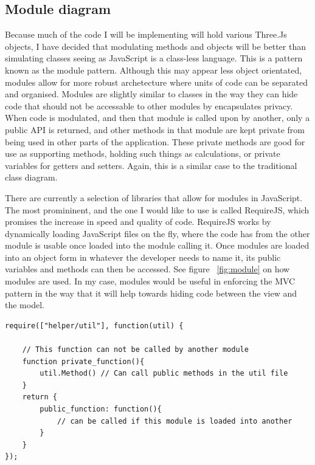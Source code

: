 \subsection{Module diagram}
\label{sec:module}
Because much of the code I will be implementing will hold various Three.Js objects, I have decided that modulating methods and objects will be better than simulating classes seeing as JavaScript is a class-less language. This is a pattern known as the module pattern. Although this may appear less object orientated, modules allow for more robust archetecture where units of code can be separated and organised. Modules are slightly similar to classes in the way they can hide code that should not be accessable to other modules by encapsulates privacy. When code is modulated, and then that module is called upon by another, only a public API is returned, and other methods in that module are kept private from being used in other parts of the application. These private methods are good for use as supporting methods, holding such things as calculations, or private variables for getters and setters. Again, this is a similar case to the traditional class diagram.

There are currently a selection of libraries that allow for modules in JavaScript. The most promininent, and the one I would like to use is called RequireJS, which promises the increase in speed and quality of code. RequireJS works by dynamically loading JavaScript files on the fly, where the code has from the other module is usable once loaded into the module calling it. Once modules are loaded into an object form in whatever the developer needs to name it, its public variables and methods can then be accessed. See figure ~\ref{fig:module} on how modules are used. In my case, modules would be useful in enforcing the MVC pattern in the way that it will help towards hiding code between the view and the model. 

\lstset{language=JavaScript}
\medskip
\begin{lstlisting}[caption=Example showing how RequireJS loads in another module or Javascript file which in this case is loading up the util javascript module and naming it as object 'util' for use in the code]
require(["helper/util"], function(util) { 
	
	// This function can not be called by another module
	function private_function(){
		util.Method() // Can call public methods in the util file
	}
	return {
		public_function: function(){
			// can be called if this module is loaded into another
		}
	}
});
\end{lstlisting}
\label{fig:module}

